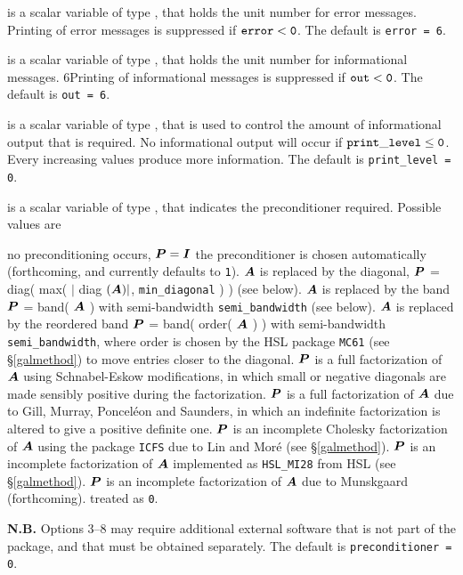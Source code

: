 \documentclass{galahad}
\begin{document}
\begin{description}

 is a scalar variable of type \integer, that holds the
unit number for error messages.
Printing of error messages is suppressed if ${\tt error} < {\tt 0}$.
The default is {\tt error = 6}.

 is a scalar variable of type \integer, that holds the
unit number for informational messages.
6Printing of informational messages is suppressed if ${\tt out} < {\tt 0}$.
The default is {\tt out = 6}.

 is a scalar variable of type \integer,
that is used
to control the amount of informational output that is required. No
informational output will occur if ${\tt print\_level} \leq {\tt 0}$. 
Every increasing values produce more information.
The default is {\tt print\_level = 0}.

 is a scalar variable of type \integer, that 
indicates the preconditioner required. Possible values are
\begin{description}
 no preconditioning occurs, ${\bm{P}} = {\bm{I}}$
  the preconditioner is chosen automatically (forthcoming,
         and currently defaults to {\tt 1}).
  ${\bm{A}}$ is replaced by the diagonal, 
         ${\bm{P}}$ = diag( max( $|$ diag $({\bm{A}})|$, {\tt min\_diagonal} ) ) (see below).
  ${\bm{A}}$ is replaced by the band 
         ${\bm{P}}$ = band( ${\bm{A}}$ ) with semi-bandwidth {\tt semi\_bandwidth}
         (see below).
  ${\bm{A}}$ is replaced by the reordered band 
         ${\bm{P}}$ = band( order( ${\bm{A}}$ ) ) with semi-bandwidth 
         {\tt semi\_bandwidth}, where order is chosen by the HSL package
         {\tt MC61} (see \S\ref{galmethod}) to move entries closer to 
         the diagonal.
  ${\bm{P}}$ is a full factorization of ${\bm{A}}$ using Schnabel-Eskow 
         modifications, in which small or negative diagonals are
         made sensibly positive during the factorization.
  ${\bm{P}}$ is a full factorization of ${\bm{A}}$  due to Gill, Murray, 
         Poncel\'{e}on and Saunders, in which an indefinite factorization 
         is altered to give a positive definite one.
  ${\bm{P}}$ is an incomplete Cholesky factorization of ${\bm{A}}$ using the 
         package {\tt ICFS} due to Lin and Mor\'{e} (see \S\ref{galmethod}).
  ${\bm{P}}$ is an incomplete factorization of ${\bm{A}}$ implemented 
         as {\tt HSL\_MI28} from HSL (see \S\ref{galmethod}).
  ${\bm{P}}$ is an incomplete factorization of ${\bm{A}}$ due 
         to Munskgaard (forthcoming).
 treated as {\tt 0}.
\end{description}
{\bf N.B.} Options 3--8 may require additional external software that 
is not part of the package, and that must be obtained separately.
The default is {\tt preconditioner = 0}.


\end{description}
\end{document}

